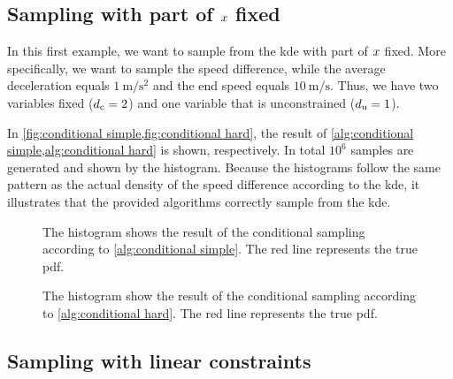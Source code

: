 \subsection{Sampling with part of $x$ fixed}

In this first example, we want to sample from the \ac{kde} with part of $x$ fixed.
More specifically, we want to sample the speed difference, while the average deceleration equals $\SI{1}{\meter\per\second\squared}$ and the end speed equals $\SI{10}{\meter\per\second}$. 
Thus, we have two variables fixed ($d_\mathrm{c}=2$) and one variable that is unconstrained ($d_\mathrm{u}=1$).

In \cref{fig:conditional simple,fig:conditional hard}, the result of \cref{alg:conditional simple,alg:conditional hard} is shown, respectively. 
In total $10^6$ samples are generated and shown by the histogram. 
Because the histograms follow the same pattern as the actual density of the speed difference according to the \ac{kde}, it illustrates that the provided algorithms correctly sample from the \ac{kde}. 

\begin{figure}
	\centering
	
	\caption{The histogram shows the result of the conditional sampling according to \cref{alg:conditional simple}. The red line represents the true \ac{pdf}.}
	\label{fig:conditional simple}
\end{figure}

\begin{figure}
	\centering
	
	\caption{The histogram show the result of the conditional sampling according to \cref{alg:conditional hard}. The red line represents the true \ac{pdf}.}
	\label{fig:conditional hard}
\end{figure}



\subsection{Sampling with linear constraints}

